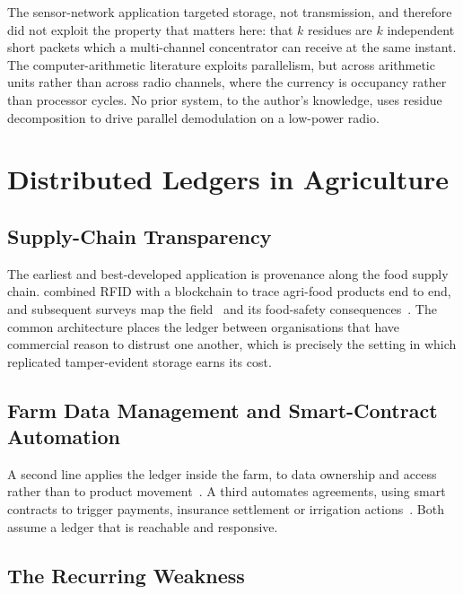 \documentclass[12pt,a4paper,oneside]{book}
\begin{document}
The sensor-network application targeted storage, not transmission, and
therefore did not exploit the property that matters here: that $k$ residues are
$k$ independent short packets which a multi-channel concentrator can receive at
the same instant. The computer-arithmetic literature exploits parallelism, but
across arithmetic units rather than across radio channels, where the currency
is occupancy rather than processor cycles. No prior system, to the author's
knowledge, uses residue decomposition to drive parallel demodulation on a
low-power radio.



\section{Distributed Ledgers in Agriculture}
\label{sec:lit_blockchain}

\subsection{Supply-Chain Transparency}

The earliest and best-developed application is provenance along the food
supply chain. \textcite{tian2016agri} combined RFID with a blockchain to trace
agri-food products end to end, and subsequent surveys map the
field~\cite{kamilaris2019rise, galvez2018future} and its food-safety
consequences~\cite{oh2025foodsafety}. The common architecture places the ledger
between organisations that have commercial reason to distrust one another,
which is precisely the setting in which replicated tamper-evident storage earns
its cost.

\subsection{Farm Data Management and Smart-Contract Automation}

A second line applies the ledger inside the farm, to data ownership and access
rather than to product movement~\cite{lin2018blockchain, ferrag2020security,
haque2024scalable}. A third automates agreements, using smart contracts to
trigger payments, insurance settlement or irrigation
actions~\cite{rama2021systematic, patil2022blockchain}. Both assume a ledger
that is reachable and responsive.

\subsection{The Recurring Weakness}
\end{document}
